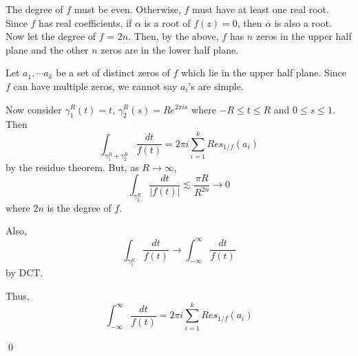 \begin{problem}[6] \hfill

	The degree of $f$ must be even.
	Otherwise, $f$ must have at least one real root.
	Since $f$ has real coefficients, if $\alpha$ is a root of $f(z) = 0$, then $\overline{\alpha}$ is also a root.
	Now let the degree of $f$ = $2n$. Then, by the above, $f$ has $n$ zeros in the upper half plane and the other $n$ zeros are in the lower half plane.
	
	Let $a_1, \cdots a_k$ be a set of distinct zeros of $f$ which lie in the upper half plane.
	Since $f$ can have multiple zeros, we cannot say $a_i$'s are simple.

	Now consider $\gamma_1^R(t) = t$, $\gamma_2^R(s) = Re^{2\pi i s}$ where $-R \leq t \leq R$ and $0 \leq s \leq 1$.
	Then
	\[
		\int_{\gamma_1^R + \gamma_2^R} \frac{dt}{f(t)} = 2\pi i \sum_{i=1}^k Res_{1/f}(a_i)
	\]
	by the residue theorem.
	But, as $R \rightarrow \infty$, 
	\[
		\int_{\gamma_2^R}\frac{dt}{|f(t)|} \lesssim \frac{\pi R}{R^{2n}} \rightarrow 0
	\]
	where $2n$ is the degree of $f$.

	Also, 
	\[
		\int_{\gamma_1^R}\frac{dt}{f(t)} \rightarrow \int_{-\infty}^\infty \frac{dt}{f(t)}
	\]
	by DCT.

	Thus, 
	\[
		\int_{-\infty}^\infty \frac{dt}{f(t)} = 2\pi i \sum_{i=1}^k Res_{1/f}(a_i)
	\]

	\qed
\end{problem}

